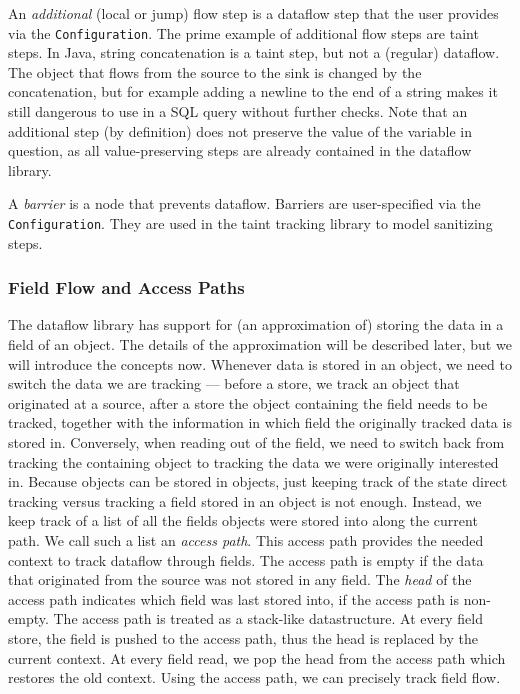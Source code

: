 An \emph{additional} (local or jump) flow step is a dataflow step that the user 
provides via the \texttt{Configuration}.
The prime example of additional flow steps are taint steps.
In Java, string concatenation is a taint step, but not a (regular) dataflow.
The object that flows from the source to the sink is changed by the concatenation,
but for example adding a newline to the end of a string makes it still dangerous
to use in a SQL query without further checks.
Note that an additional step (by definition) does not preserve the value of the
variable in question, as all value-preserving steps are already contained in the
dataflow library.

A \emph{barrier} is a node that prevents dataflow.
Barriers are user-specified via the \texttt{Configuration}.
They are used in the taint tracking library to model sanitizing steps.


\subsubsection*{Field Flow and Access Paths}
The dataflow library has support for (an approximation of) storing the data in a
field of an object. The details of the approximation will be described later, but
we will introduce the concepts now.
Whenever data is stored in an object, we need to switch the data we are tracking ---
before a store, we track an object that originated at a source, after a store the object
containing the field needs to be tracked, together with the information in which
field the originally tracked data is stored in.
Conversely, when reading out of the field, we need to switch back from tracking
the containing object to tracking the data we were originally interested in.
Because objects can be stored in objects, just keeping track of the state 
direct tracking versus tracking a field stored in an object is not enough.
Instead, we keep track of a list of all the fields objects were stored into along 
the current path.
We call such a list an \emph{access path}.
This access path provides the needed context to track dataflow through fields.
The access path is empty if the data that originated from the source was not 
stored in any field.
The \emph{head} of the access path indicates which field was last stored into,
if the access path is non-empty.
The access path is treated as a stack-like datastructure.
At every field store, the field is pushed to the access path, thus the head is
replaced by the current context.
At every field read, we pop the head from the access path which restores the old context.
Using the access path, we can precisely track field flow.

